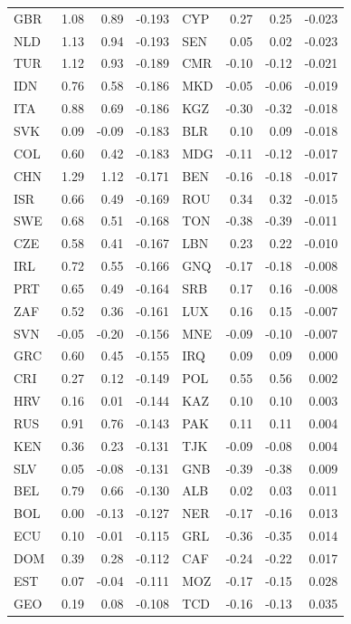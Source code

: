 \begin{tabular}{lrrr@{\hskip 2em}lrrr}
GBR & 1.08 & 0.89 & -0.193 & CYP & 0.27 & 0.25 & -0.023 \\
NLD & 1.13 & 0.94 & -0.193 & SEN & 0.05 & 0.02 & -0.023 \\
TUR & 1.12 & 0.93 & -0.189 & CMR & -0.10 & -0.12 & -0.021 \\
IDN & 0.76 & 0.58 & -0.186 & MKD & -0.05 & -0.06 & -0.019 \\
ITA & 0.88 & 0.69 & -0.186 & KGZ & -0.30 & -0.32 & -0.018 \\
SVK & 0.09 & -0.09 & -0.183 & BLR & 0.10 & 0.09 & -0.018 \\
COL & 0.60 & 0.42 & -0.183 & MDG & -0.11 & -0.12 & -0.017 \\
CHN & 1.29 & 1.12 & -0.171 & BEN & -0.16 & -0.18 & -0.017 \\
ISR & 0.66 & 0.49 & -0.169 & ROU & 0.34 & 0.32 & -0.015 \\
SWE & 0.68 & 0.51 & -0.168 & TON & -0.38 & -0.39 & -0.011 \\
CZE & 0.58 & 0.41 & -0.167 & LBN & 0.23 & 0.22 & -0.010 \\
IRL & 0.72 & 0.55 & -0.166 & GNQ & -0.17 & -0.18 & -0.008 \\
PRT & 0.65 & 0.49 & -0.164 & SRB & 0.17 & 0.16 & -0.008 \\
ZAF & 0.52 & 0.36 & -0.161 & LUX & 0.16 & 0.15 & -0.007 \\
SVN & -0.05 & -0.20 & -0.156 & MNE & -0.09 & -0.10 & -0.007 \\
GRC & 0.60 & 0.45 & -0.155 & IRQ & 0.09 & 0.09 & 0.000 \\
CRI & 0.27 & 0.12 & -0.149 & POL & 0.55 & 0.56 & 0.002 \\
HRV & 0.16 & 0.01 & -0.144 & KAZ & 0.10 & 0.10 & 0.003 \\
RUS & 0.91 & 0.76 & -0.143 & PAK & 0.11 & 0.11 & 0.004 \\
KEN & 0.36 & 0.23 & -0.131 & TJK & -0.09 & -0.08 & 0.004 \\
SLV & 0.05 & -0.08 & -0.131 & GNB & -0.39 & -0.38 & 0.009 \\
BEL & 0.79 & 0.66 & -0.130 & ALB & 0.02 & 0.03 & 0.011 \\
BOL & 0.00 & -0.13 & -0.127 & NER & -0.17 & -0.16 & 0.013 \\
ECU & 0.10 & -0.01 & -0.115 & GRL & -0.36 & -0.35 & 0.014 \\
DOM & 0.39 & 0.28 & -0.112 & CAF & -0.24 & -0.22 & 0.017 \\
EST & 0.07 & -0.04 & -0.111 & MOZ & -0.17 & -0.15 & 0.028 \\
GEO & 0.19 & 0.08 & -0.108 & TCD & -0.16 & -0.13 & 0.035 \\

\end{tabular}
